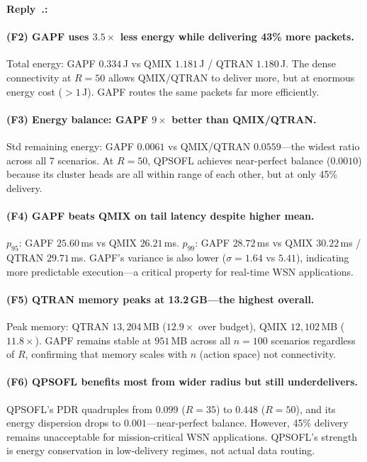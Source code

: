 \documentclass[11pt]{article}
\newcounter{reviewer}
\newcounter{replyctr}[reviewer]
\renewcommand{\thereplyctr}{\thereviewer.\arabic{replyctr}}
\newenvironment{reply}
  {\refstepcounter{replyctr}%
   \addtocounter{replyctr}{-1}%
   \medskip\noindent
   \begin{sf}\textbf{Reply~\thereplyctr:}\ }
  {\addtocounter{replyctr}{1}%
   \medskip\end{sf}}
\begin{document}
\begin{refsection}
\begin{mdframed}[style=Resp]
\begin{reply}
\paragraph{(F2) GAPF uses $3.5\times$ less energy while delivering 43\% more packets.}
Total energy: GAPF $0.334$\,J vs QMIX $1.181$\,J / QTRAN $1.180$\,J. The dense connectivity at $R{=}50$ allows QMIX/QTRAN to deliver more, but at enormous energy cost ($>1$\,J). GAPF routes the same packets far more efficiently.

\paragraph{(F3) Energy balance: GAPF $9\times$ better than QMIX/QTRAN.}
Std remaining energy: GAPF $0.0061$ vs QMIX/QTRAN $0.0559$---the widest ratio across all 7 scenarios. At $R{=}50$, QPSOFL achieves near-perfect balance ($0.0010$) because its cluster heads are all within range of each other, but at only 45\% delivery.

\paragraph{(F4) GAPF beats QMIX on tail latency despite higher mean.}
$p_{95}$: GAPF $25.60$\,ms vs QMIX $26.21$\,ms. $p_{99}$: GAPF $28.72$\,ms vs QMIX $30.22$\,ms / QTRAN $29.71$\,ms. GAPF's variance is also lower ($\sigma = 1.64$ vs $5.41$), indicating more predictable execution---a critical property for real-time WSN applications.

\paragraph{(F5) QTRAN memory peaks at 13.2\,GB---the highest overall.}
Peak memory: QTRAN $13{,}204$\,MB ($12.9\times$ over budget), QMIX $12{,}102$\,MB ($11.8\times$). GAPF remains stable at $951$\,MB across all $n{=}100$ scenarios regardless of $R$, confirming that memory scales with $n$ (action space) not connectivity.

\paragraph{(F6) QPSOFL benefits most from wider radius but still underdelivers.}
QPSOFL's PDR quadruples from $0.099$ ($R{=}35$) to $0.448$ ($R{=}50$), and its energy dispersion drops to $0.001$---near-perfect balance. However, 45\% delivery remains unacceptable for mission-critical WSN applications. QPSOFL's strength is energy conservation in low-delivery regimes, not actual data routing.


\end{reply}
\end{mdframed}
\end{refsection}
\end{document}

